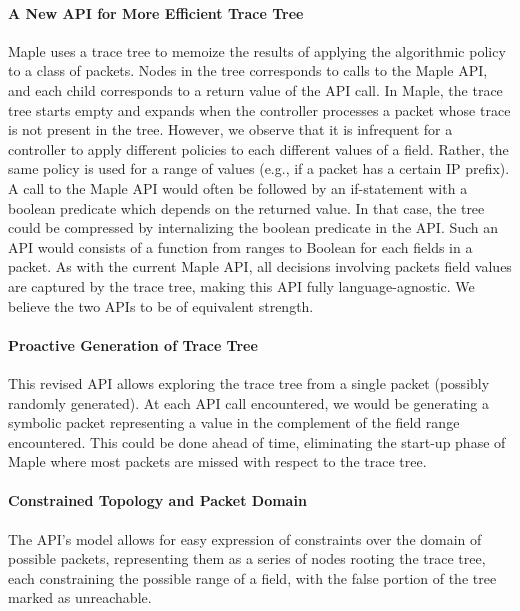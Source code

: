 \documentclass[12pt]{article}
\begin{document}
\paragraph{A New API for More Efficient Trace Tree} Maple uses a trace tree to memoize the results of applying the algorithmic policy to a class of packets. Nodes in the tree corresponds to calls to the Maple API, and each child corresponds to a return value of the API call. In Maple, the trace tree starts empty and expands when the controller processes a packet whose trace is not present in the tree. 
However, we observe that it is infrequent for a controller to apply different policies to each different values of a field. Rather, the same policy is used for a range of values (e.g., if a packet has a certain IP prefix). A call to the Maple API would often be followed by an if-statement with a boolean predicate which depends on the returned value. In that case, the tree could be compressed by internalizing the boolean predicate in the API. Such an API would consists of a function from ranges to Boolean for each fields in a packet. As with the current Maple API, all decisions involving packets field values are captured by the trace tree, making this API fully language-agnostic. We believe the two APIs to be of equivalent strength.

\paragraph{Proactive Generation of Trace Tree} This revised API allows exploring the trace tree from a single packet (possibly randomly generated). At each API call encountered, we would be generating a symbolic packet representing a value in the complement of the field range encountered. This could be done ahead of time, eliminating the start-up phase of Maple where most packets are missed with respect to the trace tree. 

\paragraph{Constrained Topology and Packet Domain} The API's model allows for easy expression of constraints over the domain of possible packets, representing them as a series of nodes rooting the trace tree, each constraining the possible range of a field, with the false portion of the tree marked as unreachable.
\end{document}
